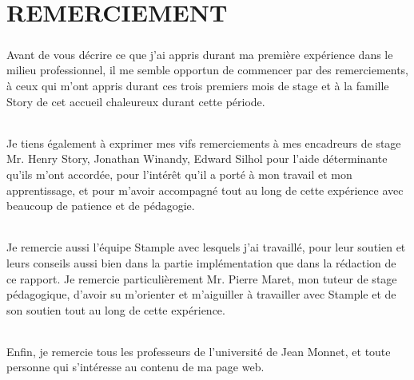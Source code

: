 \chapter{REMERCIEMENT}
\paragraph{}
Avant de vous décrire ce que j'ai appris durant ma première expérience dans le milieu 
professionnel, il me semble opportun de commencer par des remerciements, à ceux qui m'ont 
appris durant ces trois premiers mois de stage et à la famille Story de cet accueil chaleureux 
durant cette période.
\subparagraph{}
Je tiens également à exprimer mes vifs remerciements à mes encadreurs de stage Mr. Henry 
Story, Jonathan Winandy, Edward Silhol pour l'aide déterminante qu'ils m’ont accordée, pour l'intérêt qu'il a porté à mon travail et 
mon apprentissage, et pour m’avoir accompagné tout au long de cette expérience avec 
beaucoup de patience et de pédagogie.
\subparagraph{}
Je remercie aussi l'équipe Stample avec 
lesquels j'ai travaillé, pour leur soutien et leurs conseils aussi bien dans la partie 
implémentation que dans la rédaction de ce rapport.
Je remercie particulièrement Mr. Pierre Maret, mon tuteur de stage pédagogique, d'avoir su 
m'orienter et m'aiguiller à travailler avec Stample et de son soutien tout au long de cette 
expérience.
\subparagraph{}
Enfin, je remercie tous les professeurs de l'université de Jean Monnet, et toute personne qui 
s'intéresse au contenu de ma page web.